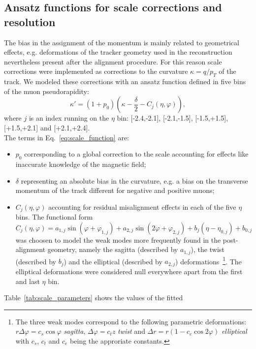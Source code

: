 \subsection{Ansatz functions for scale corrections and resolution}
The bias in the assignment of the momentum is mainly
related to geometrical effects, e.g. deformations of the tracker
geometry used in the reconstruction nevertheless present after the alignment procedure.
For this reason scale corrections were implemented as corrections to the curvature
$\kappa=q/p_T$ of the track.
We modeled these corrections with an ansatz function defined in five
bins of the muon pseudorapidity: 
\begin{equation}
\kappa' = (1+p_0) \left( \kappa -\frac{\delta}{2} - C_j(\eta,\varphi)  \right),
\label{eq:scale_function}
\end{equation}
where $j$ is an index running on the $\eta$ bin: [-2.4,-2.1],
[-2.1,-1.5], [-1.5,+1.5], [+1.5,+2.1] and [+2.1,+2.4].\\
The terms in Eq.~\ref{eq:scale_function} are:
\begin{itemize}
\item $p_0$ corresponding to a global correction to the scale accounting for effects
  like inaccurate knowledge of the magnetic field;
\item $\delta$ representing an absolute bias in the curvature, e.g. a
  bias on the transverse momentum of the track different for negative
  and positive muons;
\item $C_j(\eta,\varphi)$ accounting for residual misalignment effects
  in each of the five $\eta$ bins.
  The functional form 
  \[
  C_j(\eta,\varphi) = a_{1,j} \sin(\varphi+\varphi_{1,j}) + a_{2,j}
  \sin(2\varphi+\varphi_{2,j}) + b_j(\eta-\eta_{0,j}) + b_{0,j} 
  \]
  was choosen to model the weak modes more frequently
  found in the post-alignment geometry, namely the sagitta (described
  by $a_{1,j}$), the
  twist (described by $b_j$) and the elliptical (described
  by $a_{2,j}$) deformations~\footnote{
    The three weak modes correspond to the following parametric deformations:
    $r\Delta\varphi = c_s \cos\varphi$ {\sl sagitta},
    $\Delta\varphi = c_t z$  {\sl twist} and 
    $\Delta r = r (1- c_e \cos 2\varphi) $  {\sl elliptical}
    with $c_s$, $c_t$ and $c_e$ being the approriate constants.}. 
  The elliptical deformations were considered null everywhere apart from 
  the first and last $\eta$ bin.
\end{itemize}
Table~\ref{tab:scale_parameters} shows the values of the fitted
